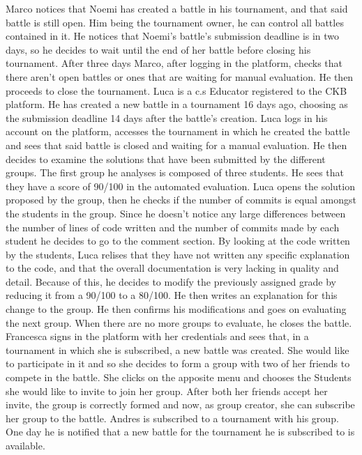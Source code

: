 \documentclass{article}
\newcounter{subsubsubsection}[subsubsection]
\begin{document}
{Marco notices that Noemi has created a battle in his tournament, and that said battle is still open.
Him being the tournament owner, he can control all battles contained in it. 
He notices that Noemi's battle's submission deadline is in two days, so he decides to wait until the end of her battle before closing his tournament.
After three days Marco, after logging in the platform, checks that there aren't open battles or ones that are waiting for manual evaluation. 
He then proceeds to close the tournament.
Luca is a c.s Educator registered to the CKB platform. 
He has created a new battle in a tournament 16 days ago, choosing as the submission deadline 14 days after the battle's creation.
Luca logs in his account on the platform, accesses the tournament in which he created the battle and sees that said battle is closed and waiting for a manual evaluation.
He then decides to examine the solutions that have been submitted by the different groups.
The first group he analyses is composed of three students. He sees that they have a score of 90/100 in the automated evaluation. 
Luca opens the solution proposed by the group, then he checks if the number of commits is equal amongst the students in the group.
Since he doesn't notice any large differences between the number of lines of code written and the number of commits made by each student he decides to go to the comment section.
By looking at the code written by the students, Luca relises that they have not written any specific explanation to the code, and that the overall documentation is very lacking 
in quality and detail. 
Because of this, he decides to modify the previously assigned grade by reducing it from a 90/100 to a 80/100.
He then writes an explanation for this change to the group. 
He then confirms his modifications and goes on evaluating the next group.
When there are no more groups to evaluate, he closes the battle.
Francesca signs in the platform with her credentials and sees that, in a tournament in which
she is subscribed, a new battle was created. 
She would like to participate in it and so she decides to form a group with two of her friends to compete in the battle. 
She clicks on the apposite menu and chooses the Students she would like to invite to join her group.
After both her friends accept her invite, the group is correctly formed and now, as group creator,
she can subscribe her group to the battle.
Andres is subscribed to a tournament with his group. One day he is notified that a new battle for the tournament he is subscribed to is available.
}
\end{document}
